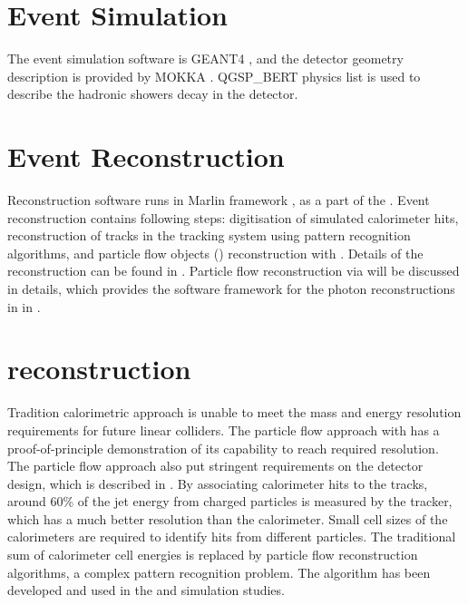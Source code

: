 \section{Event Simulation}

The event simulation software is GEANT4 \cite{Agostinelli:2002hh}, and the detector geometry description is provided by MOKKA \cite{MoradeFreitas:2002kj}.  QGSP\_BERT physics list is used to describe the hadronic showers decay in the detector.

\section{Event Reconstruction}

Reconstruction software runs in Marlin framework \cite{Gaede:2006pj}, as a part of the \ilcsoft. Event reconstruction contains following steps: digitisation of simulated calorimeter hits, reconstruction of tracks in the tracking system using pattern recognition algorithms, and particle flow objects (\PFOs) reconstruction with \pandora\cite{Thomson:2009rp,Marshall:2012ry}. Details of the reconstruction can be found in \cite{Brau:2007zza,Linssen:2012hp}. Particle flow reconstruction via \pandora will be discussed in details, which provides the software framework for the photon reconstructions in \pandora in .

\section{\pandora reconstruction}
\label{sec:pandoraPandoraPFA}

Tradition calorimetric approach is unable to meet the mass and energy resolution requirements for future linear colliders. The particle flow approach with \pandora has a proof-of-principle demonstration of its capability to reach required resolution. The particle flow approach also put stringent requirements on the detector design, which is described in . By associating calorimeter hits to the tracks, around 60\% of the jet energy from charged particles is measured by the tracker, which has a much better resolution than the calorimeter. Small cell sizes of the calorimeters are required to identify hits from different particles. The traditional sum of calorimeter cell energies is replaced by particle flow reconstruction algorithms, a complex pattern recognition problem.  The \pandora algorithm has been developed and used in the \ILC and \CLIC simulation studies.

